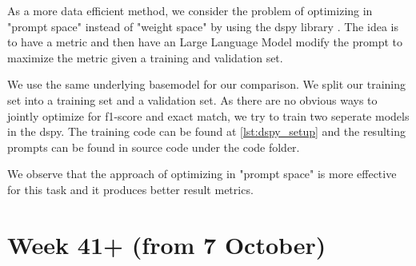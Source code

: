 \documentclass[11pt]{article}
\begin{document}
As a more data efficient method, we consider the problem of optimizing in "prompt space" instead of "weight space" by using the dspy library \cite{khattab2022demonstrate,khattab2023dspy}. 
The idea is to have a metric and then have an Large Language Model modify the prompt to maximize the metric given a training and validation set. 

We use the same underlying basemodel for our comparison.
We split our training set into a training set and a validation set. 
As there are no obvious ways to jointly optimize for f1-score and exact match, we try to train two seperate models in the dspy.
The training code can be found at \ref{lst:dspy_setup} and the resulting prompts can be found in source code under the code folder.


\begin{table}[ht]
    \centering
    \caption{Performance comparison of F1 Score and Exact Match optimized models for QA on 'answer\_inlang' field using dspy}
    \label{tab:prompt_optimized_week40_performance}
\end{table}

We observe that the approach of optimizing in "prompt space" is more effective for this task and it produces better result metrics.

\section{Week 41+ (from 7 October)}
\label{sec:week41}
\end{document}

